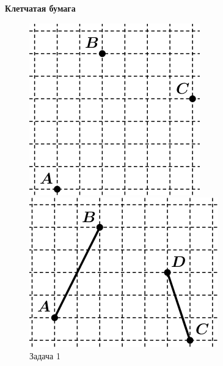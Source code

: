 \documentclass{article}
\begin{document}
    \large


    \begin{center}
        \textbf{Клетчатая бумага}
    \end{center}

    \begin{figure}[h]
        \begin{center}
            \begin{minipage}[h]{0.3\linewidth}
                \includegraphics[width=1\linewidth]{1}
                \caption{Задача 1} %
                \label{ris:1} %
            \end{minipage}
            \hfill
            \begin{minipage}[h]{0.3\linewidth}
                \includegraphics[width=1\linewidth]{5}

\end{minipage}
\end{center}
\end{figure}
\end{document}
